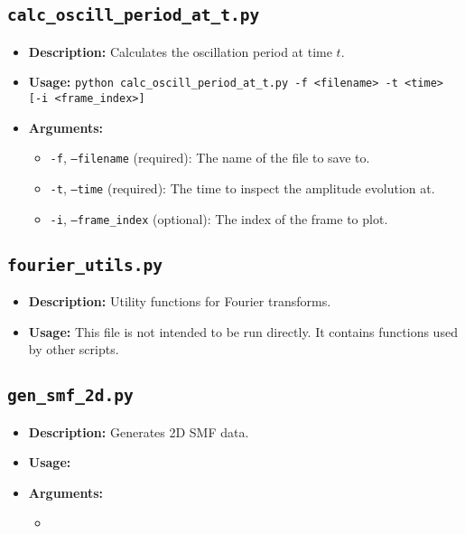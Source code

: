 \documentclass{article}
\begin{document}
\subsection{\texttt{calc\_oscill\_period\_at\_t.py}}
\begin{itemize}
    \item \textbf{Description:} Calculates the oscillation period at time \(t\).
    \item \textbf{Usage:} \texttt{python calc\_oscill\_period\_at\_t.py -f <filename> -t <time> [-i <frame\_index>]}
    \item \textbf{Arguments:}
    \begin{itemize}
        \item \texttt{-f}, \texttt{--filename} (required): The name of the file to save to.
        \item \texttt{-t}, \texttt{--time} (required): The time to inspect the amplitude evolution at.
        \item \texttt{-i}, \texttt{--frame\_index} (optional): The index of the frame to plot.
    \end{itemize}
\end{itemize}

\subsection{\texttt{fourier\_utils.py}}
\begin{itemize}
    \item \textbf{Description:} Utility functions for Fourier transforms.
    \item \textbf{Usage:} This file is not intended to be run directly. It contains functions used by other scripts.
\end{itemize}

\subsection{\texttt{gen\_smf\_2d.py}}
\begin{itemize}
    \item \textbf{Description:} Generates 2D SMF data.
    \item \textbf{Usage:} \texttt{}
    \item \textbf{Arguments:}
    \begin{itemize}
        \item
    \end{itemize}
\end{itemize}
\end{document}
